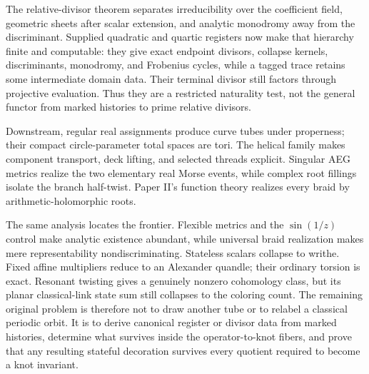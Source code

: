 The relative-divisor theorem separates irreducibility over the coefficient field,
geometric sheets after scalar extension, and analytic monodromy away from the
discriminant.  Supplied quadratic and quartic registers now make that hierarchy
finite and computable: they give exact endpoint divisors, collapse kernels,
discriminants, monodromy, and Frobenius cycles, while a tagged trace retains some
intermediate domain data.  Their terminal divisor still factors through projective
evaluation.  Thus they are a restricted naturality test, not the general functor
from marked histories to prime relative divisors.

Downstream, regular real assignments produce curve tubes under properness; their
compact circle-parameter total spaces are tori.  The helical family makes component
transport, deck lifting, and selected threads explicit.  Singular AEG metrics
realize the two elementary real Morse events, while complex root fillings isolate
the branch half-twist.  Paper II's function theory realizes every braid by
arithmetic-holomorphic roots.

The same analysis locates the frontier.  Flexible metrics and the
$\sin(1/z)$ control make analytic existence abundant, while universal braid
realization makes mere representability nondiscriminating.
Stateless scalars collapse to writhe.  Fixed affine multipliers reduce to an
Alexander quandle; their ordinary torsion is exact.  Resonant twisting gives a
genuinely nonzero cohomology class, but its planar classical-link state sum still
collapses to the coloring count.  The remaining original problem is therefore not
to draw another tube or to relabel a classical periodic orbit.  It is to derive
canonical register or divisor data from marked histories, determine what survives
inside the operator-to-knot fibers, and prove that any resulting stateful
decoration survives every quotient required to become a knot invariant.
